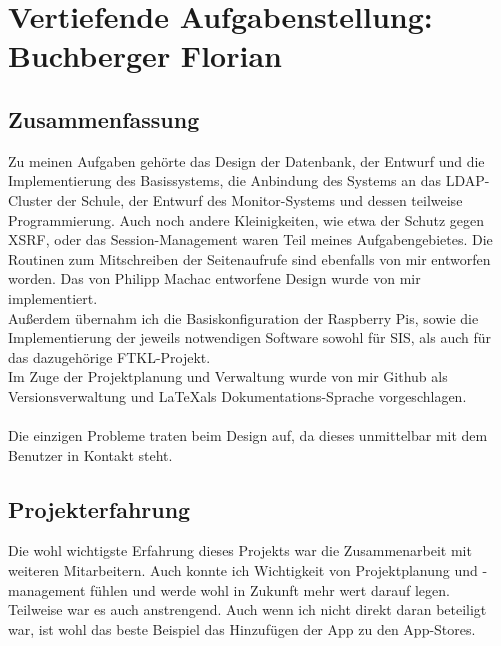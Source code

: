 \chapter[Buchberger]{Vertiefende Aufgabenstellung:\\Buchberger Florian}

\section{Zusammenfassung}
Zu meinen Aufgaben gehörte das Design der Datenbank, der Entwurf und die Implementierung des Basissystems, die Anbindung des Systems an das LDAP-Cluster der Schule, der Entwurf des Monitor-Systems und dessen teilweise Programmierung. Auch noch andere Kleinigkeiten, wie etwa der Schutz gegen XSRF, oder das Session-Management waren Teil meines Aufgabengebietes. Die Routinen zum Mitschreiben der Seitenaufrufe sind ebenfalls von mir entworfen worden. Das von Philipp Machac entworfene Design wurde von mir implementiert.\\
Außerdem übernahm ich die Basiskonfiguration der Raspberry Pis, sowie die Implementierung der jeweils notwendigen Software sowohl für SIS, als auch für das dazugehörige FTKL-Projekt.\\
Im Zuge der Projektplanung und Verwaltung wurde von mir Github als Versionsverwaltung und \LaTeX  als Dokumentations-Sprache vorgeschlagen.\\
\\
Die einzigen Probleme traten beim Design auf, da dieses unmittelbar mit dem Benutzer in Kontakt steht.
\section{Projekterfahrung}
Die wohl wichtigste Erfahrung dieses Projekts war die Zusammenarbeit mit weiteren Mitarbeitern. Auch konnte ich Wichtigkeit von Projektplanung und -management fühlen und werde wohl in Zukunft mehr wert darauf legen.\\
Teilweise war es auch anstrengend. Auch wenn ich nicht direkt daran beteiligt war, ist wohl das beste Beispiel das Hinzufügen der App zu den App-Stores.

